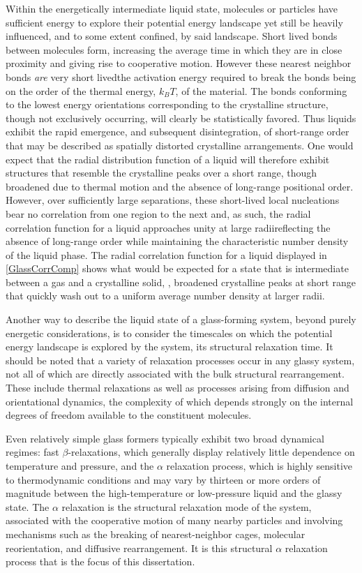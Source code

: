 Within the energetically intermediate liquid state, molecules or particles have sufficient energy to explore their potential energy landscape yet still be heavily influenced, and to some extent confined, by said landscape.  Short lived bonds between molecules form, increasing the average time in which they are in close proximity and giving rise to cooperative motion.  However these nearest neighbor bonds \textit{are} very short lived\textemdash the activation energy required to break the bonds being on the order of the thermal energy, $k_BT$, of the material. The bonds conforming to the lowest energy orientations corresponding to the crystalline structure, though not exclusively occurring, will clearly be statistically favored.  Thus liquids exhibit the rapid emergence, and subsequent disintegration, of short-range order that may be described as spatially distorted crystalline arrangements.  One would expect that the radial distribution function of a liquid will therefore exhibit structures that resemble the crystalline peaks over a short range, though broadened due to thermal motion and the absence of long-range positional order. However, over sufficiently large separations, these short-lived local nucleations bear no correlation from one region to the next and, as such, the radial correlation function for a liquid approaches unity at large radii\textemdash reflecting the absence of long-range order while maintaining the characteristic number density of the liquid phase. The radial correlation function for a liquid displayed in \fig \nolinebreak \ref{GlassCorrComp} shows what would be expected for a state that is intermediate between a gas and a crystalline solid, \ie, broadened crystalline peaks at short range that quickly wash out to a uniform average number density at larger radii.

Another way to describe the liquid state of a glass-forming system, beyond purely energetic considerations, is to consider the timescales on which the potential energy landscape is explored by the system\textemdash \ie, its structural relaxation time. It should be noted that a variety of relaxation processes occur in any glassy system, not all of which are directly associated with the bulk structural rearrangement. These include thermal relaxations as well as processes arising from diffusion and orientational dynamics, the complexity of which depends strongly on the internal degrees of freedom available to the constituent molecules. 

Even relatively simple glass formers typically exhibit two broad dynamical regimes: fast $\beta$-relaxations, which generally display relatively little dependence on temperature and pressure, and the $\alpha$ relaxation process, which is highly sensitive to thermodynamic conditions and may vary by thirteen or more orders of magnitude between the high-temperature or low-pressure liquid and the glassy state. The $\alpha$ relaxation is the structural relaxation mode of the system, associated with the cooperative motion of many nearby particles and involving mechanisms such as the breaking of nearest-neighbor cages, molecular reorientation, and diffusive rearrangement. It is this structural $\alpha$ relaxation process that is the focus of this dissertation.

